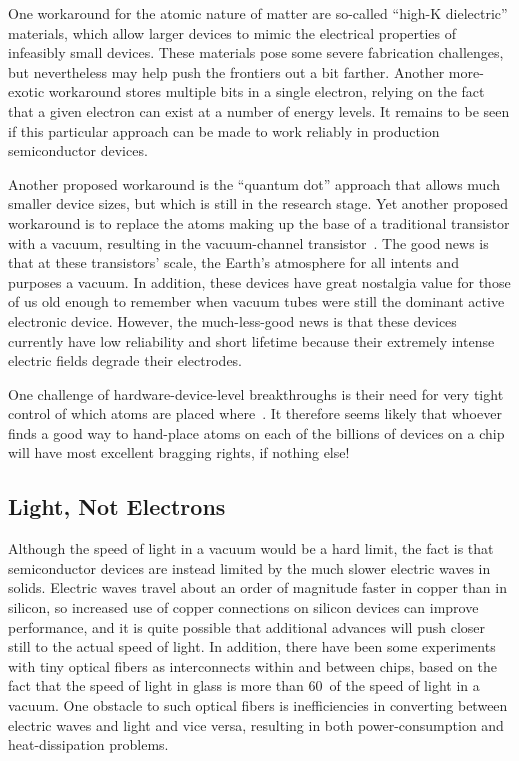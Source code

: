 One workaround for the atomic nature of matter are so-called
``high-K dielectric'' materials, which allow larger devices to mimic the
electrical properties of infeasibly small devices.
These materials pose some severe fabrication challenges, but nevertheless
may help push the frontiers out a bit farther.
Another more-exotic workaround stores multiple bits in a single electron,
relying on the fact that a given electron can exist at a number of
energy levels.
It remains to be seen if this particular approach can be made to work
reliably in production semiconductor devices.

Another proposed workaround is the ``quantum dot'' approach that
allows much smaller device sizes, but which is still in the research
stage.
Yet another proposed workaround is to replace the atoms making up the
base of a traditional transistor with a vacuum, resulting in the
vacuum-channel transistor~\cite{JinWooHan2014VacuumGapTransistor}.
The good news is that at these transistors' scale, the Earth's atmosphere
for all intents and purposes a vacuum.
In addition, these devices have great nostalgia value for those of us
old enough to remember when vacuum tubes were still the dominant active
electronic device.
However, the much-less-good news is that these devices currently have low
reliability and short lifetime because their extremely intense electric
fields degrade their electrodes.

One challenge of hardware-device-level breakthroughs is their need for
very tight control of which atoms are placed
where~\cite{MichaelJKelly2017DeviceLevel}.
It therefore seems likely that whoever finds a good way to hand-place
atoms on each of the billions of devices on a chip will have most
excellent bragging rights, if nothing else!

\subsection{Light, Not Electrons}
\label{sec:cpu:Light; Not Electrons}

Although the speed of light in a vacuum would be a hard limit, the fact
is that semiconductor devices are instead limited by the much slower
electric waves in solids.
Electric waves travel about an order of magnitude faster in copper than
in silicon, so increased use of copper connections on silicon devices can
improve performance, and it is quite possible that additional advances
will push closer still to the actual speed of light.
In addition, there have been some experiments with tiny optical fibers
as interconnects within and between chips, based on the fact that
the speed of light in glass is more than 60\pct\ of the speed of light
in a vacuum.
One obstacle to such optical fibers is inefficiencies in converting
between electric waves and light and vice versa, resulting in both
power-consumption and heat-dissipation problems.

